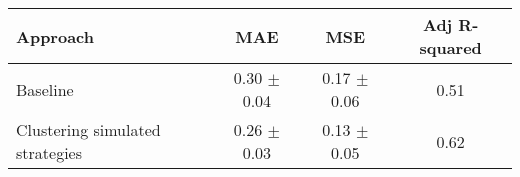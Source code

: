    \begin{tabular}{l c c c }
    \toprule
    
    
    Approach & MAE & MSE & Adj R-squared \\ 
    
    \midrule
    Baseline & 0.30 $\pm$ 0.04  & 0.17 $\pm$ 0.06 & 0.51  \\ 
    Clustering simulated strategies & 0.26 $\pm$ 0.03 & 0.13 $\pm$ 0.05 &  0.62 \\ 
    

    \bottomrule
        
    \end{tabular}
    
    
    
    
    
    
    

        
 